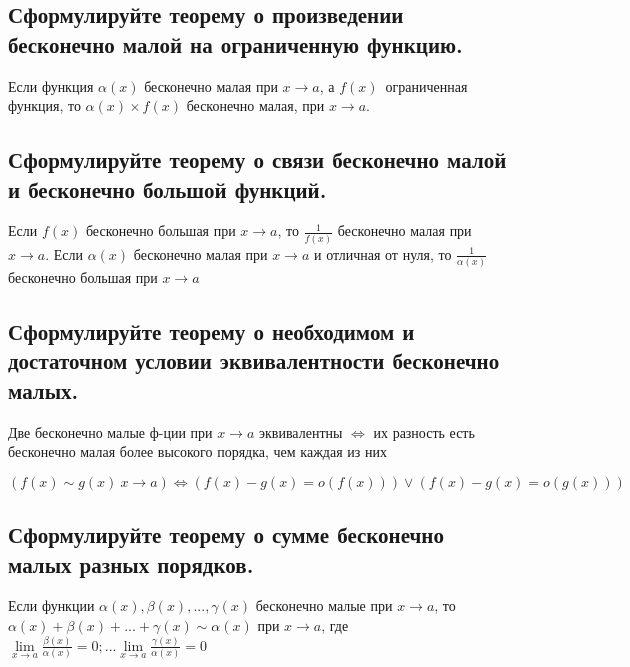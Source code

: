 \documentclass[a4paper, 10pt]{article}
\begin{document}
    \subsection{Сформулируйте теорему о произведении бесконечно малой на ограниченную функцию. }
    
    Если функция $\alpha  (x)$ бесконечно малая при $x \to a$, а $f(x)$ ограниченная функция, то
    $\alpha  (x) \times f(x)$ бесконечно малая, при $x \to a$.

    \subsection{Сформулируйте теорему о связи бесконечно малой и бесконечно большой функций. }

    Если $f(x)$ бесконечно большая при $x \to a$, то $\frac{1}{f(x)}$ бесконечно малая при $x \to a$.
    Если $\alpha  (x)$ бесконечно малая при $x \to a$ и отличная от нуля, то $\frac{1}{\alpha (x)}$ 
    бесконечно большая при $x \to a$

    \subsection{Сформулируйте теорему о необходимом и достаточном условии эквивалентности бесконечно малых. }

    Две бесконечно малые ф-ции при $x \to a$ эквивалентны $\iff$ их разность есть бесконечно
    малая более высокого порядка, чем каждая из них

    $$(f(x) \sim g(x) \ x \to a) \iff (f(x) - g(x) = o(f(x))) \vee (f(x) - g(x) = o(g(x)))$$


    \subsection{Сформулируйте теорему о сумме бесконечно малых разных порядков. }
    
    Если функции $\alpha  (x), \beta (x), ..., \gamma (x)$ бесконечно малые при $x \to a$,
    то $\alpha  (x) + \beta (x) + ... + \gamma (x) \sim \alpha  (x)$ при $x \to a$,
    где $\lim\limits_{x \to a} \frac{\beta (x)}{\alpha (x)} = 0; ...
    \lim\limits_{x \to a} \frac{\gamma (x)}{\alpha (x)} = 0$
    
\end{document}
